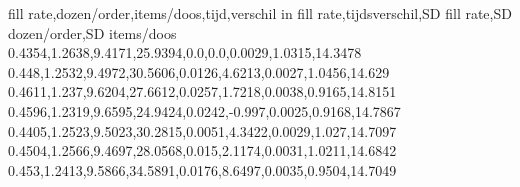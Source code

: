 fill rate,dozen/order,items/doos,tijd,verschil in fill rate,tijdsverschil,SD fill rate,SD dozen/order,SD items/doos
0.4354,1.2638,9.4171,25.9394,0.0,0.0,0.0029,1.0315,14.3478
0.448,1.2532,9.4972,30.5606,0.0126,4.6213,0.0027,1.0456,14.629
0.4611,1.237,9.6204,27.6612,0.0257,1.7218,0.0038,0.9165,14.8151
0.4596,1.2319,9.6595,24.9424,0.0242,-0.997,0.0025,0.9168,14.7867
0.4405,1.2523,9.5023,30.2815,0.0051,4.3422,0.0029,1.027,14.7097
0.4504,1.2566,9.4697,28.0568,0.015,2.1174,0.0031,1.0211,14.6842
0.453,1.2413,9.5866,34.5891,0.0176,8.6497,0.0035,0.9504,14.7049
